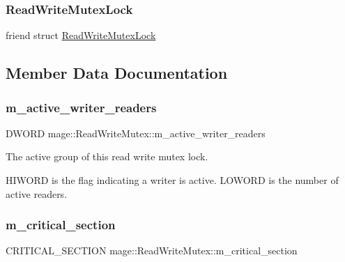 \subsubsection{\texorpdfstring{Read\+Write\+Mutex\+Lock}{ReadWriteMutexLock}}
{\footnotesize\ttfamily friend struct \hyperlink{structmage_1_1_read_write_mutex_lock}{Read\+Write\+Mutex\+Lock}\hspace{0.3cm}{\ttfamily [friend]}}



\subsection{Member Data Documentation}
\hypertarget{classmage_1_1_read_write_mutex_a1e0ad98e517236170faae5b27decfdce}{}\label{classmage_1_1_read_write_mutex_a1e0ad98e517236170faae5b27decfdce} 
\subsubsection{\texorpdfstring{m\+\_\+active\+\_\+writer\+\_\+readers}{m\_active\_writer\_readers}}
{\footnotesize\ttfamily D\+W\+O\+RD mage\+::\+Read\+Write\+Mutex\+::m\+\_\+active\+\_\+writer\+\_\+readers\hspace{0.3cm}{\ttfamily [private]}}

The active group of this read write mutex lock.

H\+I\+W\+O\+RD is the flag indicating a writer is active. L\+O\+W\+O\+RD is the number of active readers. \hypertarget{classmage_1_1_read_write_mutex_a77fe51b87e5205d60ea045fa53bc1fa3}{}\label{classmage_1_1_read_write_mutex_a77fe51b87e5205d60ea045fa53bc1fa3} 
\subsubsection{\texorpdfstring{m\+\_\+critical\+\_\+section}{m\_critical\_section}}
{\footnotesize\ttfamily C\+R\+I\+T\+I\+C\+A\+L\+\_\+\+S\+E\+C\+T\+I\+ON mage\+::\+Read\+Write\+Mutex\+::m\+\_\+critical\+\_\+section\hspace{0.3cm}{\ttfamily [private]}}

